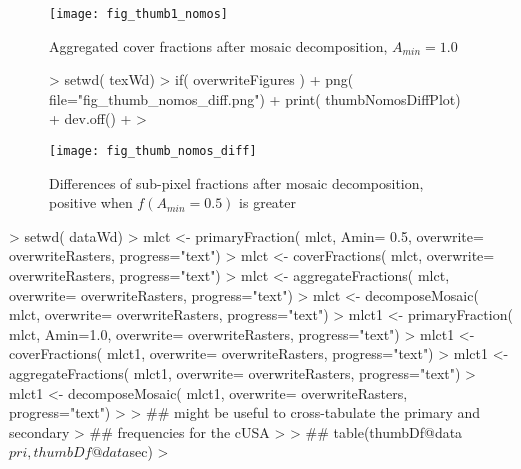 \begin{figure} 
\begin{center}
  
\begin{Schunk}
\end{Schunk}


\texttt{[image: fig\_thumb1\_nomos]}
\end{center} 
\caption{Aggregated cover fractions after mosaic decomposition, $A_{min}=1.0$}
\label{fig:thumb1_nomos}
\end{figure} 

\begin{figure} 
\begin{center}
  
\begin{Schunk}
\begin{Sinput}
> setwd( texWd)
> if( overwriteFigures ) {
+   png( file="fig_thumb_nomos_diff.png")
+   print( thumbNomosDiffPlot)
+   dev.off()
+ }
> 
\end{Sinput}
\end{Schunk}

\texttt{[image: fig\_thumb\_nomos\_diff]}
\end{center} 
\caption{Differences of sub-pixel fractions after mosaic
  decomposition, positive when $f(A_{min} = 0.5)$ is greater}
\label{fig:thumb_diff}
\end{figure} 




\begin{Schunk}
\begin{Sinput}
> setwd( dataWd)
> mlct  <- primaryFraction( mlct, Amin= 0.5, overwrite= overwriteRasters, progress="text")
> mlct  <- coverFractions( mlct, overwrite= overwriteRasters, progress="text")
> mlct  <- aggregateFractions( mlct, overwrite= overwriteRasters, progress="text")
> mlct  <- decomposeMosaic( mlct, overwrite= overwriteRasters, progress="text")
> mlct1  <- primaryFraction( mlct, Amin=1.0, overwrite= overwriteRasters, progress="text")
> mlct1  <- coverFractions( mlct1, overwrite= overwriteRasters, progress="text")
> mlct1  <- aggregateFractions( mlct1, overwrite= overwriteRasters, progress="text")
> mlct1  <- decomposeMosaic( mlct1, overwrite= overwriteRasters, progress="text")
> 
> ## might be useful to cross-tabulate the primary and secondary
> ## frequencies for the cUSA
> 
> ## table(thumbDf@data$pri, thumbDf@data$sec)
> 
\end{Sinput}
\end{Schunk}


